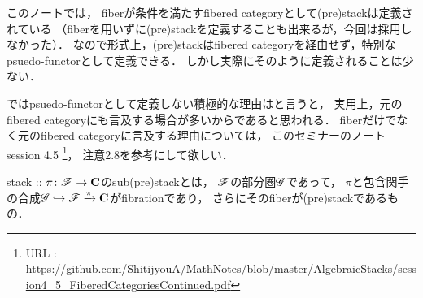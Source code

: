 \documentclass[a4paper]{jsarticle}
\begin{document}
\begin{Remark}
    このノートでは，
    fiberが条件を満たすfibered categoryとして(pre)stackは定義されている
    （fiberを用いずに(pre)stackを定義することも出来るが，今回は採用しなかった）．
    なので形式上，(pre)stackはfibered categoryを経由せず，特別なpsuedo-functorとして定義できる．
    しかし実際にそのように定義されることは少ない．

    ではpsuedo-functorとして定義しない積極的な理由はと言うと，
    実用上，元のfibered categoryにも言及する場合が多いからであると思われる．
    fiberだけでなく元のfibered categoryに言及する理由については，
    このセミナーのノート session 4.5
    \footnote{URL : \url{https://github.com/ShitijyouA/MathNotes/blob/master/AlgebraicStacks/session4_5_FiberedCategoriesContinued.pdf}}，
    注意2.8を参考にして欲しい．
\end{Remark}

\begin{Def}
    stack :: $\pi \colon \mathscr{F} \to \mathbf{C}$のsub(pre)stackとは，
    $\mathscr{F}$の部分圏$\mathscr{G}$であって，
    $\pi$と包含関手の合成$\mathscr{G} \hookrightarrow \mathscr{F} \xrightarrow{\pi} \mathbf{C}$がfibrationであり，
    さらにそのfiberが(pre)stackであるもの．
\end{Def}
\end{document}
